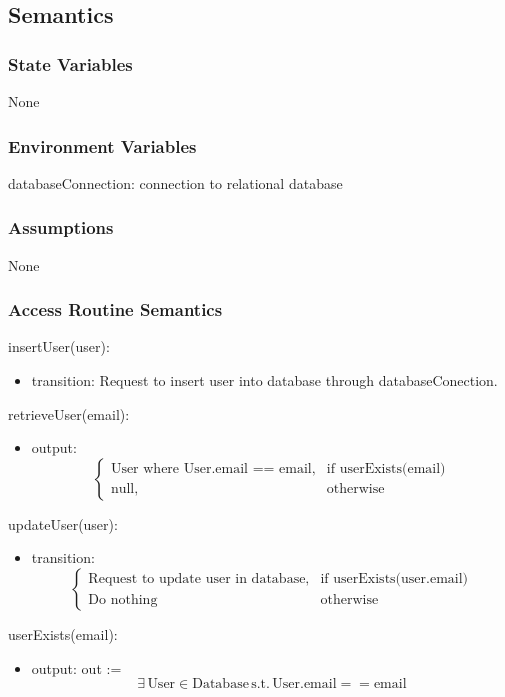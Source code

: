 \documentclass[12pt, titlepage]{article}
\begin{document}
\subsection{Semantics}

\subsubsection{State Variables}
None
\subsubsection{Environment Variables}
databaseConnection: connection to relational database

\subsubsection{Assumptions}
None

\subsubsection{Access Routine Semantics}

\noindent insertUser(user):
\begin{itemize}
\item transition: Request to insert user into database through databaseConection.
\end{itemize}

\noindent retrieveUser(email):
\begin{itemize}
\item output: 
\[
\begin{cases}
    \text{User where User.email == email}, & \text{if } \text{userExists(email)}\\
    \text{null}, & \text{otherwise}
\end{cases}
\]
\end{itemize}

\noindent updateUser(user):
\begin{itemize}
\item transition: 
\[
\begin{cases}
    \text{Request to update user in database}, & \text{if } \text{userExists(user.email)}\\
    \text{Do nothing} & \text{otherwise}
\end{cases}
\]
\end{itemize}

\noindent userExists(email):
\begin{itemize}
\item output: out := 
\[ \exists \, \text{User} \in \text{Database} \, \text{s.t.} \, \text{User.email} == \text{email}
\]
\end{itemize}
\end{document}
